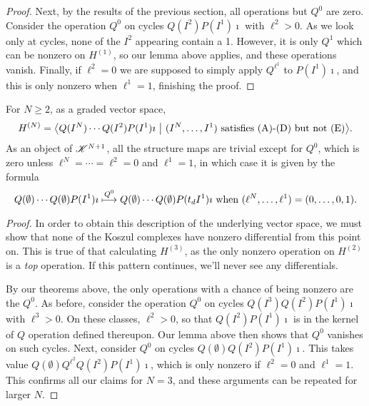 \documentclass[11pt]{article}
\newcommand{\LL}[1]{{\scrK}^{#1}}%
\renewcommand{\Q}{Q}
\begin{document}
\begin{CalculatingRepeatedKoszul}
\begin{proof}
Next, by the results of the previous section, all operations but $\Q^0$ are zero. Consider the operation $Q^0$ on cycles $\Q(I^2)P(I^1)\imath$ with $\ell^2>0$. As we look only at cycles, none of the $I^2$ appearing contain a 1. However, it is only $\Q^1$ which can be nonzero on $H^{(1)}$, so our lemma above applies, and these operations vanish. Finally, if $\ell^2=0$ we are supposed to simply apply $\Q^{\ell^1}$ to $P(I^1)\imath$, and this is only nonzero when $\ell^1=1$, finishing the proof.
\end{proof}

\begin{prop*}
For $N\geq2$, as a graded vector space,
\[H^{(N)}={\left\langle \Q(I^N)\cdots \Q(I^2)P(I^1)\imath\ \middle|\  (I^N,\ldots,I^1)\textup{ satisfies (A)-(D) but not (E)}\right\rangle}.\]
As an object of $\LL{N+1}$, all the structure maps are trivial except for $\Q^0$, which is zero unless $\ell^N=\cdots =\ell^2=0$ and $\ell^1=1$, in which case it is given by the formula
\[\Q(\emptyset)\cdots \Q(\emptyset)P(I^1)\imath \overset{\Q^0}{\mapsto} \Q(\emptyset)\cdots \Q(\emptyset)P(t_dI^1)\imath\textup{ when $(\ell^N,\ldots,\ell^1)=(0,\ldots,0,1)$}.\]
\end{prop*}
\begin{proof}
In order to obtain this description of the underlying vector space, we must show that none of the Koszul complexes have nonzero differential from this point on. This is true of that calculating $H^{(3)}$, as the only nonzero operation on $H^{(2)}$ is a \emph{top} operation. If this pattern continues, we'll never see any differentials.

By our theorems above, the only operations with a chance of being nonzero are the $Q^0$. As before, consider the operation $Q^0$ on cycles $\Q(I^3)\Q(I^2)P(I^1)\imath$ with $\ell^3>0$. On these classes, $\ell^2>0$, so that $\Q(I^2)P(I^1)\imath$ is in the kernel of $\Q$ operation defined thereupon. Our lemma above then shows that $Q^0$ vanishes on such cycles. Next, consider $\Q^0$ on cycles $\Q(\emptyset)\Q(I^2)P(I^1)\imath$. This takes value $\Q(\emptyset)\Q^{\ell^2}\Q(I^2)P(I^1)\imath$, which is only nonzero if $\ell^2=0$ and $\ell^1=1$. This confirms all our claims for $N=3$, and these arguments can be repeated for larger $N$.
\end{proof}

\end{CalculatingRepeatedKoszul}
\end{document}
